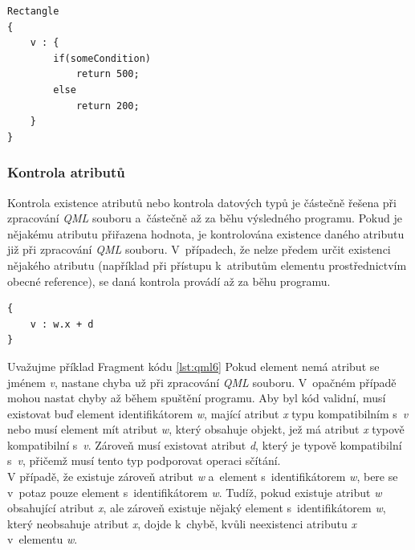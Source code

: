 \documentclass[11pt,twoside,a4paper]{book}
\begin{document}
\begin{lstlisting}[frame=single,caption=Ukázka použití funkce definované v rámci elementu pro určení hodnoty atributu.,label=lst:qml9]
Rectangle
{
	v : {
		if(someCondition)
			return 500;
		else
			return 200;
	}
}
\end{lstlisting}

\subsubsection{Kontrola atributů}
Kontrola existence atributů nebo kontrola datových typů je částečně řešena při zpracování \textit{QML} souboru a~částečně až za běhu výsledného programu. Pokud je nějakému atributu přiřazena hodnota, je kontrolována existence daného atributu již při zpracování \textit{QML} souboru. V~případech, že nelze předem určit existenci nějakého atributu (například při přístupu k~atributům elementu prostřednictvím obecné reference), se daná kontrola provádí až za běhu programu.
\begin{lstlisting}[frame=single,caption=Ukázka přístupu k atributu pomocí reference na element.,label=lst:qml6]
{
	v : w.x + d
}
\end{lstlisting}
Uvažujme příklad Fragment kódu \ref{lst:qml6} Pokud element nemá atribut se jménem \textit{v}, nastane chyba už při zpracování \textit{QML} souboru. V~opačném případě mohou nastat chyby až během spuštění programu. Aby byl kód validní, musí existovat buď element identifikátorem \textit{w}, mající atribut \textit{x} typu kompatibilním s~\textit{v} nebo musí element mít atribut \textit{w}, který obsahuje objekt, jež má atribut \textit{x} typově kompatibilní s~\textit{v}. Zároveň musí existovat atribut \textit{d}, který je typově kompatibilní s~\textit{v}, přičemž musí tento typ podporovat operaci sčítání.\\
V případě, že existuje zároveň atribut \textit{w} a~element s~identifikátorem \textit{w}, bere se v~potaz pouze element s~identifikátorem \textit{w}. Tudíž, pokud existuje atribut \textit{w} obsahující atribut \textit{x}, ale zároveň existuje nějaký element s~identifikátorem \textit{w}, který neobsahuje atribut \textit{x}, dojde k~chybě, kvůli neexistenci atributu \textit{x} v~elementu \textit{w}. 
\end{document}
